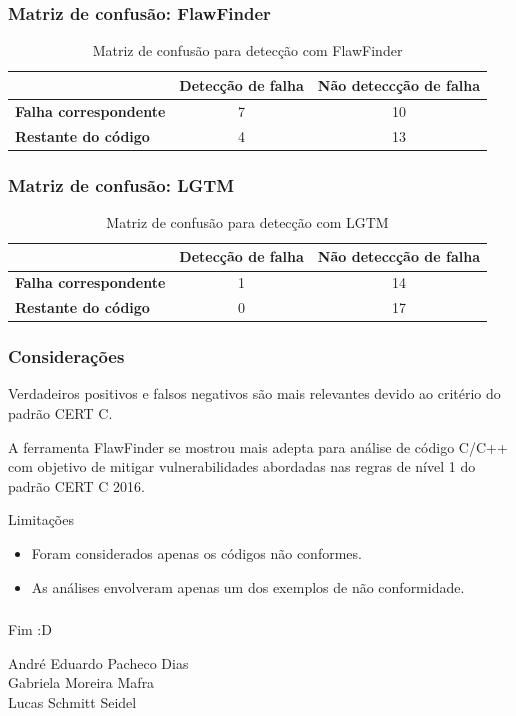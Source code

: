 \documentclass{beamer}
\begin{document}
\begin{frame}
  \frametitle{Matriz de confusão: FlawFinder}
  \begin{table}[ht]
    \hspace*{-19px}
    \begin{tabular}{@{}lcc@{}}
    \toprule
                        & \textbf{Detecção de falha} & \multicolumn{1}{l}{\textbf{Não deteccção de falha}} \\ \midrule
    \textbf{Falha correspondente} & 7                        & 10                                               \\
    \textbf{Restante do código} & 4                        & 13                                               \\ \bottomrule
    \end{tabular}
    \caption{Matriz de confusão para detecção com FlawFinder}
    \label{tab:flawfinder}
    \end{table}
\end{frame}

\begin{frame}
  \frametitle{Matriz de confusão: LGTM}
  \begin{table}[ht]
    \hspace*{-19px}
    \begin{tabular}{@{}lcc@{}}
    \toprule
                        & \textbf{Detecção de falha} & \multicolumn{1}{l}{\textbf{Não deteccção de falha}} \\ \midrule
    \textbf{Falha correspondente} & 1                        & 14                                               \\
    \textbf{Restante do código} & 0                        & 17                                               \\ \bottomrule
    \end{tabular}
    \caption{Matriz de confusão para detecção com LGTM}
    \label{tab:lgtm}
    \end{table}
\end{frame}

\begin{frame}
  \frametitle{Considerações}
  Verdadeiros positivos e falsos negativos são mais relevantes devido ao critério do padrão CERT C.\\\medskip

  A ferramenta FlawFinder se mostrou mais adepta para análise de código C/C++ com objetivo de mitigar vulnerabilidades abordadas nas regras de nível 1 do padrão CERT C 2016.\pause

  \begin{block}{Limitações}
    \begin{itemize}
      \item Foram considerados apenas os códigos não conformes.
      \item As análises envolveram apenas um dos exemplos de não conformidade.
    \end{itemize}

  \end{block}
\end{frame}

\begin{frame}
  \frametitle{}
  {\Huge Fim :D}\\\bigskip

  André Eduardo Pacheco Dias\\
  Gabriela Moreira Mafra\\
  Lucas Schmitt Seidel

\end{frame}
\end{document}
